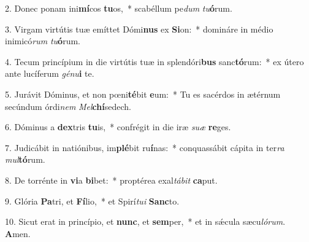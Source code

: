 2. Donec ponam ini\textbf{mí}cos \textbf{tu}os,~*  scabéllum pe\textit{dum} \textit{tu}\textbf{ó}rum.\

3. Virgam virtútis tuæ emíttet Dómi\textbf{nus} ex \textbf{Si}on:~*  domináre in médio inimicó\textit{rum} \textit{tu}\textbf{ó}rum.\

4. Tecum princípium in die virtútis tuæ in splendóri\textbf{bus} sanc\textbf{tó}rum:~*  ex útero ante lucíferum \textit{gé}\textit{nu}\textbf{i} te.\

5. Jurávit Dóminus, et non pœni\textbf{té}bit \textbf{e}um:~*  Tu es sacérdos in ætérnum secúndum órdi\textit{nem} \textit{Mel}\textbf{chí}sedech.\

6. Dóminus a \textbf{dex}tris \textbf{tu}is,~*  confrégit in die iræ \textit{su}\textit{æ} \textbf{re}ges.\

7. Judicábit in natiónibus, im\textbf{plé}bit ru\textbf{í}nas:~*  conquassábit cápita in ter\textit{ra} \textit{mul}\textbf{tó}rum.\

8. De torrénte in \textbf{vi}a \textbf{bi}bet:~*  proptérea exal\textit{tá}\textit{bit} \textbf{ca}put.\

9. Glória \textbf{Pa}tri, et \textbf{Fí}lio,~*  et Spirí\textit{tu}\textit{i} \textbf{Sanc}to.\

10. Sicut erat in princípio, et \textbf{nunc}, et \textbf{sem}per,~*  et in sǽcula sæcu\textit{ló}\textit{rum}. \textbf{A}men.\

